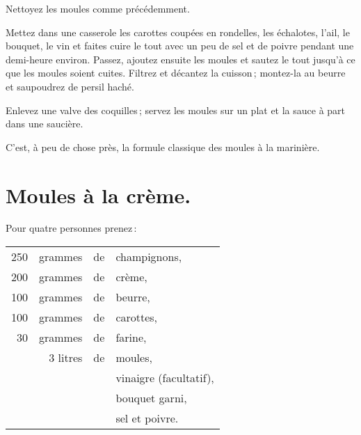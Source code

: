 Nettoyez les moules comme précédemment.

Mettez dans une casserole les carottes coupées en rondelles, les échalotes,
l'ail, le bouquet, le vin et faites cuire le tout avec un peu de sel et de
poivre pendant une demi-heure environ. Passez, ajoutez ensuite les moules et
sautez le tout jusqu'à ce que les moules soient cuites. Filtrez et décantez la
cuisson ; montez-la au beurre et saupoudrez de persil haché.

Enlevez une valve des coquilles ; servez les moules sur un plat et la sauce
à part dans une saucière.

C'est, à peu de chose près, la formule classique des moules à la marinière.

\section*{\centering Moules à la crème.}

Pour quatre personnes prenez :

\medskip

\footnotesize
\begin{longtable}{rrrp{16em}}
    250 & grammes &  de & champignons,                                                                    \\
    200 & grammes &  de & crème,                                                                          \\
    100 & grammes &  de & beurre,                                                                         \\
    100 & grammes &  de & carottes,                                                                       \\
     30 & grammes &  de & farine,                                                                         \\
        & 3 litres&  de & moules,                                                                         \\
        &         &     & vinaigre (facultatif),                                                          \\
        &         &     & bouquet garni,                                                                  \\
        &         &     & sel et poivre.                                                                  \\
\end{longtable}
\normalsize

